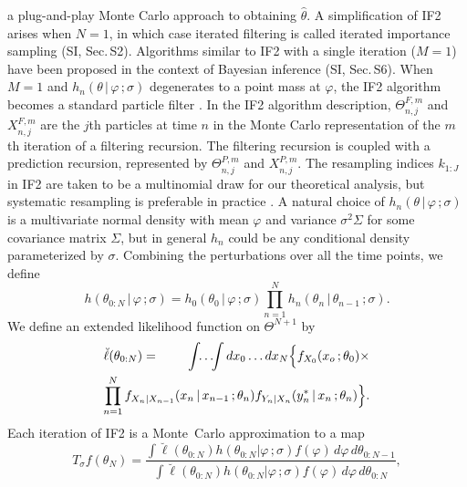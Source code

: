\documentclass{pnastwo}\usepackage[]{graphicx}\usepackage[]{color}
\newcommand\secIIS{S2}
\newcommand\SupSecLW{S6}
\newcommand\mySection{{Sec.$\,$}}
\newcommand\given{{\, | \,}}
\newcommand\giventh{\,;}
\newcommand\lik{\ell}
\newcommand\Thetaspace{{\bbTheta}}
\newcommand{\bbTheta}{\Theta}
\newcommand\IF{IF2}
\begin{document}
\begin{article}
\vspace{2mm}

\noindent
a plug-and-play Monte Carlo approach to obtaining $\hat\theta$. 
A simplification of {\IF} arises when $N=1$, in which case iterated filtering is called iterated importance sampling \cite{ionides11} (SI, {\mySection}{\secIIS}).
Algorithms similar to {\IF} with a single iteration ($M=1$) have been proposed  in the context of Bayesian inference \cite{kitagawa98,janeliu01} (SI, {\mySection}{\SupSecLW}).
When $M=1$ and $h_n(\theta\given\varphi\giventh\sigma)$ degenerates to a point mass at $\varphi$, the IF2  algorithm becomes a standard particle filter \cite{arulampalam02,doucet01}.
In the IF2 algorithm description, $\Theta^{F,m}_{n,j}$ and $X^{F,m}_{n,j}$ are the $j$th particles at time $n$ in the Monte Carlo representation of the $m$th iteration of a filtering recursion.
The filtering recursion is coupled with a prediction recursion, represented by $\Theta^{P,m}_{n,j}$ and $X^{P,m}_{n,j}$.
The resampling indices $k_{1:J}$ in IF2 are taken to be a multinomial draw for our theoretical analysis, but systematic resampling is preferable in practice \cite{arulampalam02}.
A natural choice of $h_n(\theta\given\varphi\giventh\sigma)$ is a multivariate normal density with mean $\varphi$ and variance $\sigma^2\Sigma$ for some covariance matrix $\Sigma$, but in general $h_n$ could be any conditional density parameterized by $\sigma$.
Combining the perturbations over all the time points, we define
\begin{equation} \nonumber
h(\theta_{0:N}\given\varphi\giventh\sigma)=h_0(\theta_0\given\varphi\giventh\sigma)\prod_{n=1}^Nh_n(\theta_n\given\theta_{n-1}\giventh\sigma).
\end{equation}
We define an extended likelihood function on $\Thetaspace^{N+1}$ by
\begin{eqnarray}\nonumber
\breve\lik(\theta_{0:N})&=&\!\! \int\!\!\dots\!\!\int  dx_0\dots dx_N \Big\{ f_{X_0}(x_o\giventh\theta_0) \times
\\ \nonumber
&&\hspace{-1.8cm}\prod_{n=1}^N f_{X_n|X_{n-1}}(x_n\given x_{n-1}\giventh\theta_{n})f_{Y_n|X_n}(y^*_n\given x_{n}\giventh\theta_{n})\Big\}.
\end{eqnarray}
Each iteration of  {\IF} is a Monte~Carlo approximation to a map
\begin{equation}\label{recursion:if} %
T_\sigma f(\theta_N)=
\frac{\int \breve\lik(\theta_{0:N})h(\theta_{0:N}|\varphi\giventh\sigma)f(\varphi)\,d\varphi \, d\theta_{0:N-1}}{\int \breve\lik(\theta_{0:N})h(\theta_{0:N}|\varphi\giventh\sigma)f(\varphi)\,d\varphi \, d\theta_{0:N}},

\end{equation}
\end{article}
\end{document}
